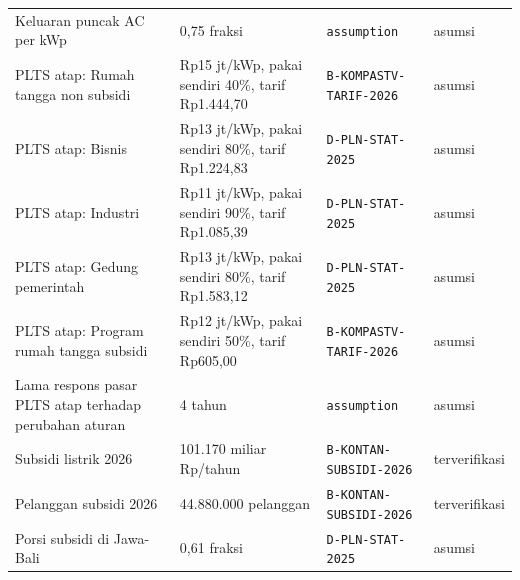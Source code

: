\begin{longtable}{p{} p{} p{} p{}}
Keluaran puncak AC per kWp & 0,75 fraksi & \texttt{assumption} & asumsi \\
PLTS atap: Rumah tangga non subsidi & Rp15 jt/kWp, pakai sendiri 40\%, tarif Rp1.444,70 & \texttt{B-\allowbreak{}KOMPASTV-\allowbreak{}TARIF-\allowbreak{}2026} & asumsi \\
PLTS atap: Bisnis & Rp13 jt/kWp, pakai sendiri 80\%, tarif Rp1.224,83 & \texttt{D-\allowbreak{}PLN-\allowbreak{}STAT-\allowbreak{}2025} & asumsi \\
PLTS atap: Industri & Rp11 jt/kWp, pakai sendiri 90\%, tarif Rp1.085,39 & \texttt{D-\allowbreak{}PLN-\allowbreak{}STAT-\allowbreak{}2025} & asumsi \\
PLTS atap: Gedung pemerintah & Rp13 jt/kWp, pakai sendiri 80\%, tarif Rp1.583,12 & \texttt{D-\allowbreak{}PLN-\allowbreak{}STAT-\allowbreak{}2025} & asumsi \\
PLTS atap: Program rumah tangga subsidi & Rp12 jt/kWp, pakai sendiri 50\%, tarif Rp605,00 & \texttt{B-\allowbreak{}KOMPASTV-\allowbreak{}TARIF-\allowbreak{}2026} & asumsi \\
Lama respons pasar PLTS atap terhadap perubahan aturan & 4 tahun & \texttt{assumption} & asumsi \\
Subsidi listrik 2026 & 101.170 miliar Rp/tahun & \texttt{B-\allowbreak{}KONTAN-\allowbreak{}SUBSIDI-\allowbreak{}2026} & terverifikasi \\
Pelanggan subsidi 2026 & 44.880.000 pelanggan & \texttt{B-\allowbreak{}KONTAN-\allowbreak{}SUBSIDI-\allowbreak{}2026} & terverifikasi \\
Porsi subsidi di Jawa-Bali & 0,61 fraksi & \texttt{D-\allowbreak{}PLN-\allowbreak{}STAT-\allowbreak{}2025} & asumsi \\
\bottomrule
\end{longtable}
